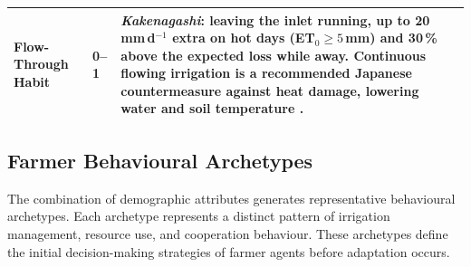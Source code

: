 \documentclass{article}
\begin{document}
\begin{changed}
\begin{tabular}{|p{3.1cm}|p{1.2cm}|p{12cm}|}
\textbf{Flow-Through Habit} & 0--1 & \emph{Kakenagashi}: leaving the inlet running, up to 20\,mm\,d$^{-1}$ extra on hot days (ET$_0\ge5$\,mm) and 30\,\% above the expected loss while away. Continuous flowing irrigation is a recommended Japanese countermeasure against heat damage, lowering water and soil temperature \citep{Morita2016Heat}. \\ \hline
\end{tabular}
\label{tab:demographic_attributes}
\end{changed}

\subsection{Farmer Behavioural Archetypes}

The combination of demographic attributes generates representative behavioural archetypes. Each archetype represents a distinct pattern of irrigation management, resource use, and cooperation behaviour. These archetypes define the initial decision-making strategies of farmer agents before adaptation occurs.
\end{document}
